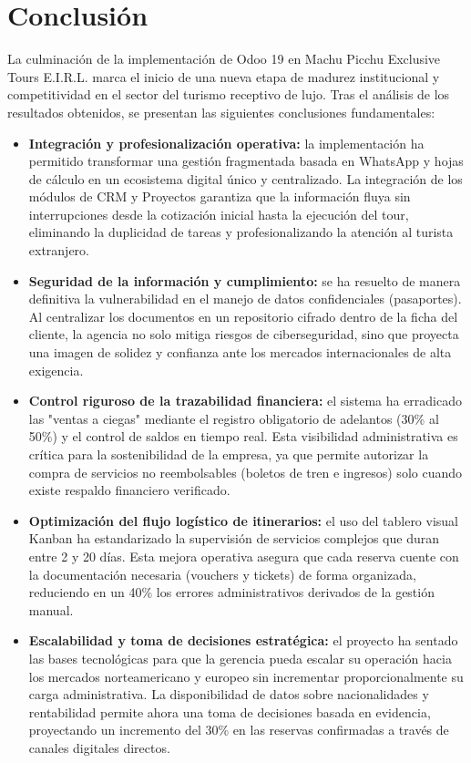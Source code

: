 \section{Conclusión}

La culminación de la implementación de Odoo 19 en Machu Picchu Exclusive Tours E.I.R.L.
marca el inicio de una nueva etapa de madurez institucional y competitividad en el sector del
turismo receptivo de lujo. Tras el análisis de los resultados obtenidos, se presentan las
siguientes conclusiones fundamentales:

\begin{itemize}
    \item \textbf{Integración y profesionalización operativa:} la implementación ha permitido transformar una gestión fragmentada basada en WhatsApp y hojas de cálculo en un ecosistema digital único y centralizado. La integración de los módulos de CRM y Proyectos garantiza que la información fluya sin interrupciones desde la cotización inicial hasta la ejecución del tour, eliminando la duplicidad de tareas y profesionalizando la atención al turista extranjero.
    \item \textbf{Seguridad de la información y cumplimiento:} se ha resuelto de manera definitiva la vulnerabilidad en el manejo de datos confidenciales (pasaportes). Al centralizar los documentos en un repositorio cifrado dentro de la ficha del cliente, la agencia no solo mitiga riesgos de ciberseguridad, sino que proyecta una imagen de solidez y confianza ante los mercados internacionales de alta exigencia.
    \item \textbf{Control riguroso de la trazabilidad financiera:} el sistema ha erradicado las "ventas a ciegas" mediante el registro obligatorio de adelantos (30\% al 50\%) y el control de saldos en tiempo real. Esta visibilidad administrativa es crítica para la sostenibilidad de la empresa, ya que permite autorizar la compra de servicios no reembolsables (boletos de tren e ingresos) solo cuando existe respaldo financiero verificado.
    \item \textbf{Optimización del flujo logístico de itinerarios:} el uso del tablero visual Kanban ha estandarizado la supervisión de servicios complejos que duran entre 2 y 20 días. Esta mejora operativa asegura que cada reserva cuente con la documentación necesaria (vouchers y tickets) de forma organizada, reduciendo en un 40\% los errores administrativos derivados de la gestión manual.
    \item \textbf{Escalabilidad y toma de decisiones estratégica:} el proyecto ha sentado las bases tecnológicas para que la gerencia pueda escalar su operación hacia los mercados norteamericano y europeo sin incrementar proporcionalmente su carga administrativa. La disponibilidad de datos sobre nacionalidades y rentabilidad permite ahora una toma de decisiones basada en evidencia, proyectando un incremento del 30\% en las reservas confirmadas a través de canales digitales directos.
\end{itemize}
